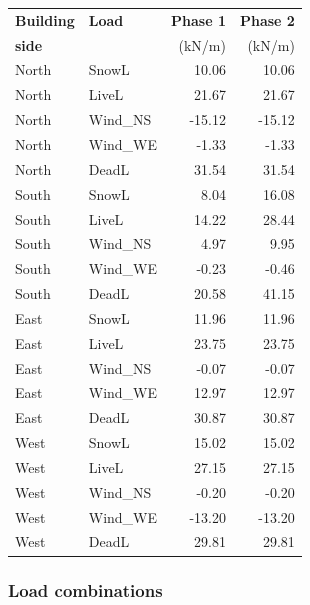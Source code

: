 \begin{center}
  \begin{tabular}{|l|l|r|r|}
\hline
\textbf{Building} & \textbf{Load} & \textbf{Phase 1} & \textbf{Phase 2}\\
\textbf{side} &  & (kN/m) & (kN/m)\\
\hline
North & SnowL & 10.06 & 10.06\\
North & LiveL & 21.67 & 21.67\\
North & Wind\_NS & -15.12 & -15.12\\
North & Wind\_WE & -1.33 & -1.33\\
North & DeadL & 31.54 & 31.54\\
\hline
South & SnowL & 8.04 & 16.08\\
South & LiveL & 14.22 & 28.44\\
South & Wind\_NS & 4.97 & 9.95\\
South & Wind\_WE & -0.23 & -0.46\\
South & DeadL & 20.58 & 41.15\\
\hline
East & SnowL & 11.96 & 11.96\\
East & LiveL & 23.75 & 23.75\\
East & Wind\_NS & -0.07 & -0.07\\
East & Wind\_WE & 12.97 & 12.97\\
East & DeadL & 30.87 & 30.87\\
\hline
West & SnowL & 15.02 & 15.02\\
West & LiveL & 27.15 & 27.15\\
West & Wind\_NS & -0.20 & -0.20\\
West & Wind\_WE & -13.20 & -13.20\\
West & DeadL & 29.81 & 29.81\\
\hline
\end{tabular}
\end{center}

\subsubsection{Load combinations} \label{sc_load_combinations}

